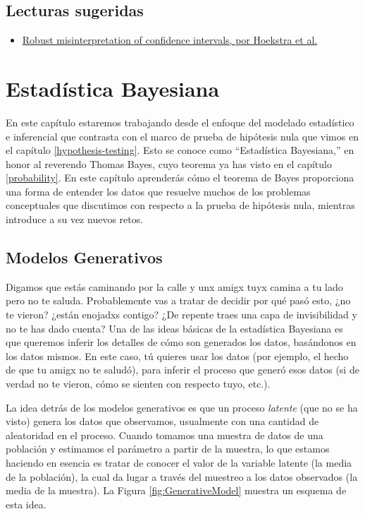 \documentclass[
  12pt,
]{book}
\providecommand{\tightlist}{%
  \setlength{\itemsep}{0pt}\setlength{\parskip}{0pt}}
\begin{document}
\hypertarget{lecturas-sugeridas-7}{%
\section{Lecturas sugeridas}\label{lecturas-sugeridas-7}}

\begin{itemize}
\tightlist
\item
  \href{http://www.ejwagenmakers.com/inpress/HoekstraEtAlPBR.pdf}{Robust misinterpretation of confidence intervals, por Hoekstra et al.}
\end{itemize}

\hypertarget{bayesian-statistics}{%
\chapter{Estadística Bayesiana}\label{bayesian-statistics}}

En este capítulo estaremos trabajando desde el enfoque del modelado estadístico e inferencial que contrasta con el marco de prueba de hipótesis nula que vimos en el capítulo \ref{hypothesis-testing}. Esto se conoce como ``Estadística Bayesiana,'' en honor al reverendo Thomas Bayes, cuyo teorema ya has visto en el capítulo \ref{probability}. En este capítulo aprenderás cómo el teorema de Bayes proporciona una forma de entender los datos que resuelve muchos de los problemas conceptuales que discutimos con respecto a la prueba de hipótesis nula, mientras introduce a su vez nuevos retos.

\hypertarget{modelos-generativos}{%
\section{Modelos Generativos}\label{modelos-generativos}}

Digamos que estás caminando por la calle y unx amigx tuyx camina a tu lado pero no te saluda. Probablemente vas a tratar de decidir por qué pasó esto, ¿no te vieron? ¿están enojadxs contigo? ¿De repente traes una capa de invisibilidad y no te has dado cuenta? Una de las ideas básicas de la estadística Bayesiana es que queremos inferir los detalles de cómo son generados los datos, basándonos en los datos mismos. En este caso, tú quieres usar los datos (por ejemplo, el hecho de que tu amigx no te saludó), para inferir el proceso que generó esos datos (si de verdad no te vieron, cómo se sienten con respecto tuyo, etc.).

La idea detrás de los modelos generativos es que un proceso \emph{latente} (que no se ha visto) genera los datos que observamos, usualmente con una cantidad de aleatoridad en el proceso. Cuando tomamos una muestra de datos de una población y estimamos el parámetro a partir de la muestra, lo que estamos haciendo en esencia es tratar de conocer el valor de la variable latente (la media de la población), la cual da lugar a través del muestreo a los datos observados (la media de la muestra). La Figura \ref{fig:GenerativeModel} muestra un esquema de esta idea.
\end{document}
